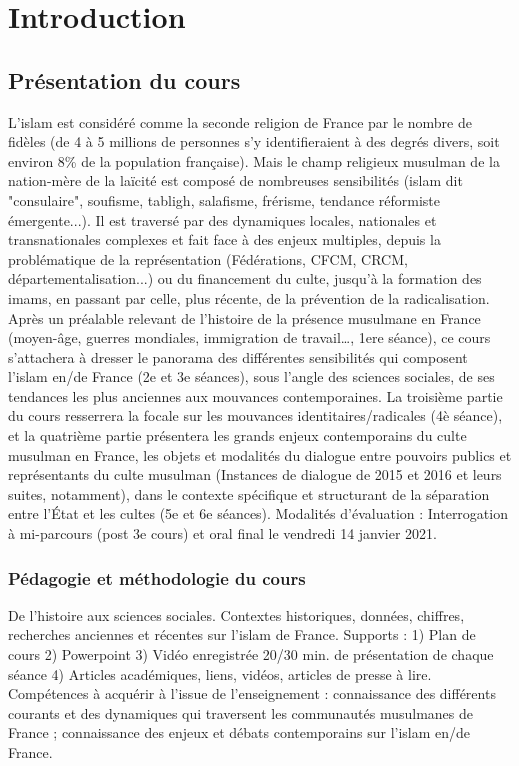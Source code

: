 \chapter{Introduction}


\section{Présentation du cours} 
L’islam est considéré comme la seconde religion de France par
le nombre de fidèles (de 4 à 5 millions de personnes s'y identifieraient à des degrés
divers, soit environ 8\% de la population française). Mais le champ religieux musulman
de la nation-mère de la laïcité est composé de nombreuses sensibilités (islam dit
"consulaire", soufisme, tabligh, salafisme, frérisme, tendance réformiste émergente...).
Il est traversé par des dynamiques locales, nationales et transnationales complexes et
fait face à des enjeux multiples, depuis la problématique de la représentation
(Fédérations, CFCM, CRCM, départementalisation...) ou du financement du culte,
jusqu'à la formation des imams, en passant par celle, plus récente, de la prévention de la
radicalisation. Après un préalable relevant de l’histoire de la présence musulmane en
France (moyen-âge, guerres mondiales, immigration de travail…, 1ere séance), ce cours
s'attachera à dresser le panorama des différentes sensibilités qui composent l'islam en/de
France (2e et 3e
séances), sous l’angle des sciences sociales, de ses tendances les plus
anciennes aux mouvances contemporaines. La troisième partie du cours resserrera la
focale sur les mouvances identitaires/radicales (4è séance), et la quatrième partie
présentera les grands enjeux contemporains du culte musulman en France, les objets et
modalités du dialogue entre pouvoirs publics et représentants du culte musulman
(Instances de dialogue de 2015 et 2016 et leurs suites, notamment), dans le contexte
spécifique et structurant de la séparation entre l’État et les cultes (5e
et 6e
séances).
Modalités d’évaluation : Interrogation à mi-parcours (post 3e
cours) et oral final le
vendredi 14 janvier 2021.


\subsection{Pédagogie et méthodologie du cours}
De l’histoire aux sciences sociales. Contextes
historiques, données, chiffres, recherches anciennes et récentes sur l’islam de France.
Supports : 1) Plan de cours 2) Powerpoint 3) Vidéo enregistrée 20/30 min. de
présentation de chaque séance 4) Articles académiques, liens, vidéos, articles de presse
à lire.
Compétences à acquérir à l’issue de l’enseignement : connaissance des différents
courants et des dynamiques qui traversent les communautés musulmanes de France ;
connaissance des enjeux et débats contemporains sur l’islam en/de France. 

